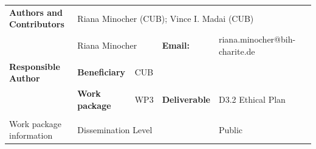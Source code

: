 \vspace{0.2cm}

\begin{table}[b]
\begin{tabular}{llllll}
\textbf{Authors and Contributors}             & \multicolumn{4}{l}{Riana Minocher (CUB); Vince I. Madai (CUB)}                                                         \\ 
                                              & \multicolumn{2}{l}{Riana Minocher} & \textbf{Email:}  &  riana.minocher@bih-charite.de  \\ 
\multirow{-2}{*}{\textbf{Responsible Author}} & \textbf{Beneficiary}              & CUB       &                  &  \\ \hline
                                              & \textbf{Work package}   & WP3   & \textbf{Deliverable}              & D3.2 Ethical Plan \\ 
                                              & \cellcolor[HTML]{D0CECE}\textbf{} & \cellcolor[HTML]{D0CECE} & \cellcolor[HTML]{D0CECE}\textbf{} & \cellcolor[HTML]{D0CECE}                                      \\
\multirow{-3}{*}{Work package information}    & \multicolumn{3}{l}{Dissemination Level}                                                          & Public                           
\end{tabular}
\end{table}